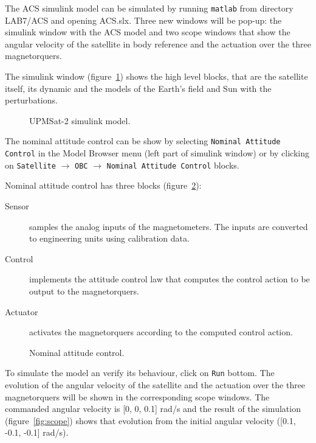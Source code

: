 The ACS simulink model can be simulated by running {\tt matlab} from directory LAB7/ACS and opening ACS.slx. Three new windows will be pop-up: the simulink window with the ACS model and two scope windows that show the angular velocity of the satellite in body reference and the actuation over the three magnetorquers.

The simulink window (figure~\ref{fig:acs-simulink}) shows the high level blocks, that are the satellite itself, its dynamic and the models of the Earth's field and Sun with the perturbations.

\begin{figure}[h]
            \caption{UPMSat-2 simulink model.}
            \label{fig:acs-simulink}
\end{figure}

The nominal attitude control can be show by selecting {\tt Nominal Attitude Control} in the Model Browser menu (left part of simulink window) or by clicking on {\tt Satellite} $\rightarrow$ {\tt OBC} $\rightarrow$ {\tt Nominal Attitude Control} blocks.

Nominal attitude control has three blocks (figure~\ref{fig:nac}):
\begin{description}
\item[Sensor] samples the analog inputs of the magnetometers. The inputs are converted to engineering units using calibration data.
\item[Control] implements the attitude control law that computes the control action to be output to the magnetorquers.
\item[Actuator] activates the magnetorquers according to the computed control action.
\end{description}

\begin{figure}[H]
            \caption{Nominal attitude control.}
            \label{fig:nac}
\end{figure}

To simulate the model an verify its behaviour, click on {\tt Run} bottom. The evolution of the angular velocity of the satellite and the actuation over the three magnetorquers will be shown in the corresponding scope windows. The commanded angular velocity is [0, 0, 0.1] rad/s and the result of the simulation (figure~\ref{fig:scope}) shows that evolution from the initial angular velocity ([0.1, -0.1, -0.1] rad/s).

